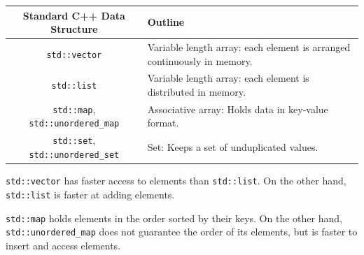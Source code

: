 \documentclass[]{book}
\begin{document}
\begin{longtable}[]{@{}cl@{}}
\toprule
\begin{minipage}[b]{0.40\columnwidth}\centering
Standard C++ Data Structure\strut
\end{minipage} & \begin{minipage}[b]{0.54\columnwidth}\raggedright
Outline\strut
\end{minipage}\tabularnewline
\midrule
\endhead
\begin{minipage}[t]{0.40\columnwidth}\centering
\texttt{std::vector}\strut
\end{minipage} & \begin{minipage}[t]{0.54\columnwidth}\raggedright
Variable length array: each element is arranged continuously in memory.\strut
\end{minipage}\tabularnewline
\begin{minipage}[t]{0.40\columnwidth}\centering
\texttt{std::list}\strut
\end{minipage} & \begin{minipage}[t]{0.54\columnwidth}\raggedright
Variable length array: each element is distributed in memory.\strut
\end{minipage}\tabularnewline
\begin{minipage}[t]{0.40\columnwidth}\centering
\texttt{std::map}, \texttt{std::unordered\_map}\strut
\end{minipage} & \begin{minipage}[t]{0.54\columnwidth}\raggedright
Associative array: Holds data in key-value format.\strut
\end{minipage}\tabularnewline
\begin{minipage}[t]{0.40\columnwidth}\centering
\texttt{std::set}, \texttt{std::unordered\_set}\strut
\end{minipage} & \begin{minipage}[t]{0.54\columnwidth}\raggedright
Set: Keeps a set of unduplicated values.\strut
\end{minipage}\tabularnewline
\bottomrule
\end{longtable}

\texttt{std::vector} has faster access to elements than \texttt{std::list}. On the other hand, \texttt{std::list} is faster at adding elements.

\texttt{std::map} holds elements in the order sorted by their keys. On the other hand, \texttt{std::unordered\_map} does not guarantee the order of its elements, but is faster to insert and access elements.
\end{document}
